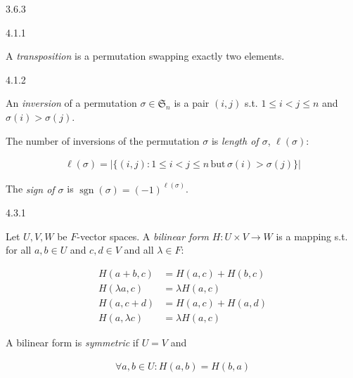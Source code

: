 \documentclass[10pt]{article} %
\renewcommand{\leq}{\leqslant}
\DeclareMathOperator{\sgn}{sgn}
\begin{document}
\begin{multicols}{3}
\begin{definition}{3.6.3}{}
\end{definition}


\begin{definition}{4.1.1}{}

    A \emph{transposition} is a permutation swapping exactly two elements.

\end{definition}

\begin{definition}{4.1.2}{}

    An \emph{inversion} of a permutation $\sigma \in \mathfrak{S}_n$ is a pair $(i,j)$ s.t. $1 \leq i < j \leq n$ and $\sigma(i) > \sigma(j)$.

    The number of inversions of the permutation $\sigma$ is \emph{length of $\sigma$}, $\ell(\sigma)$:

        \begin{align*}
            \ell(\sigma) = |\{(i,j) : 1 \leq i < j \leq n \,\mathrm{but}\, \sigma(i) > \sigma(j)\}|
        \end{align*}

    The \emph{sign of $\sigma$} is $\sgn\!{(\sigma)} = (-1)^{\ell(\sigma)}$.

\end{definition}

\begin{definition}{4.3.1}{}

    Let $U,V,W$ be $F$-vector spaces. A \emph{bilinear form} $H: U \times V \to W$ is a mapping s.t. for all $a,b \in U$ and $c,d \in V$ and all $\lambda \in F$:

        \begin{align*}
            H(a + b,c) &= H(a,c) + H(b,c) \\
            H(\lambda a,c) &= \lambda H(a,c) \\
            H(a,c + d) &= H(a,c) + H(a,d) \\
            H(a,\lambda c) &= \lambda H(a,c)
        \end{align*}

    A bilinear form is \emph{symmetric} if $U = V$ and

        \begin{align*}
            \forall a,b \in U: H(a,b) = H(b,a)
        \end{align*}


\end{definition}
\end{multicols}
\end{document}
